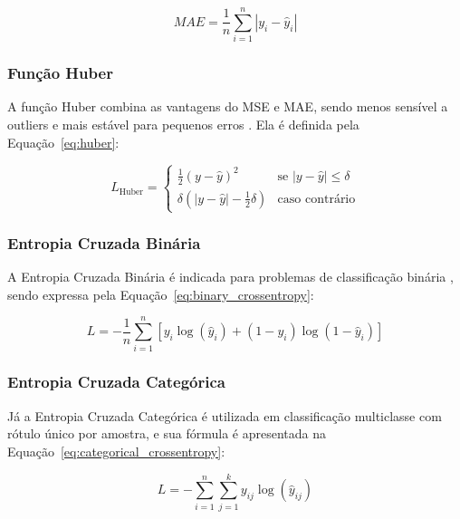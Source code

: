 \begin{equation}
    MAE = \frac{1}{n} \sum_{i=1}^{n} |y_i - \hat{y}_i|
    \label{eq:mae}
\end{equation}

\subsubsection{Função Huber}

A função Huber combina as vantagens do MSE e MAE, sendo menos sensível a outliers e mais estável para pequenos erros \cite{huber1964robust}. Ela é definida pela Equação~\ref{eq:huber}:

\begin{equation}
    L_{\text{Huber}} =
    \begin{cases}
        \frac{1}{2}(y - \hat{y})^2 & \text{se } |y - \hat{y}| \leq \delta \\
        \delta (|y - \hat{y}| - \frac{1}{2} \delta) & \text{caso contrário}
    \end{cases}
    \label{eq:huber}
\end{equation}

\subsubsection{Entropia Cruzada Binária}

A Entropia Cruzada Binária é indicada para problemas de classificação binária \cite{zhang2018cross}, sendo expressa pela Equação~\ref{eq:binary_crossentropy}:

\begin{equation}
    L = -\frac{1}{n} \sum_{i=1}^{n} \left[y_i \log(\hat{y}_i) + (1 - y_i) \log(1 - \hat{y}_i)\right]
    \label{eq:binary_crossentropy}
\end{equation}

\subsubsection{Entropia Cruzada Categórica}

Já a Entropia Cruzada Categórica é utilizada em classificação multiclasse com rótulo único por amostra, e sua fórmula é apresentada na Equação~\ref{eq:categorical_crossentropy}:

\begin{equation}
    L = -\sum_{i=1}^{n} \sum_{j=1}^{k} y_{ij} \log(\hat{y}_{ij})
    \label{eq:categorical_crossentropy}
\end{equation}

